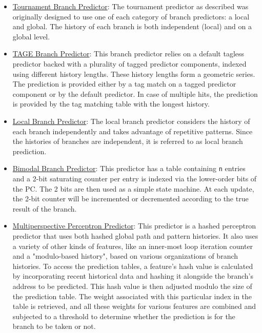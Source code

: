 \documentclass[twocolumn,showpacs,%
  nofootinbib,aps,superscriptaddress,%
  eqsecnum,prd,notitlepage,showkeys,10pt]{revtex4-1}
\begin{document}
\begin{itemize}
    \item \underline{Tournament Branch Predictor}: The tournament predictor as described was originally designed to use one of each category of branch predictors: a local and global. The history of each branch is both independent (local) and on a global level.\cite{mcfarling1993combining}
    \item \underline{TAGE Branch Predictor}: This branch predictor relies on a default tagless predictor backed with a plurality of tagged predictor components, indexed using different history lengths. These history lengths form a geometric series. The prediction is provided either by a tag match on a tagged predictor component or by the default predictor. In case of multiple hits, the prediction is provided by the tag matching table with the longest history.\cite{seznec2006case}
    \item \underline{Local Branch Predictor}: The local branch predictor considers the history of each branch independently and takes advantage of repetitive patterns. Since the histories of branches are independent, it is referred to as local branch prediction.\cite{mcfarling1993combining}
    \item \underline{Bimodal Branch Predictor}: This predictor has a table containing \texttt{n} entries and a 2-bit saturating counter per entry is indexed via the lower-order bits of the PC. The 2 bits are then used as a simple state machine. At each update, the 2-bit counter will be incremented or decremented according to the true result of the branch.\cite{peress2008historical}
    \item \underline{Multiperspective Perceptron Predictor}: This predictor is a hashed perceptron predictor that uses both hashed global path and pattern histories. It also uses a variety of other kinds of features, like an inner-most loop iteration counter and a "modulo-based history",  based on various organizations of branch histories. To access the prediction tables, a feature's hash value is calculated by incorporating recent historical data and hashing it alongside the branch's address to be predicted. This hash value is then adjusted modulo the size of the prediction table. The weight associated with this particular index in the table is retrieved, and all these weights for various features are combined and subjected to a threshold to determine whether the prediction is for the branch to be taken or not.\cite{jimenez2016multiperspective}
\end{itemize}
\end{document}
